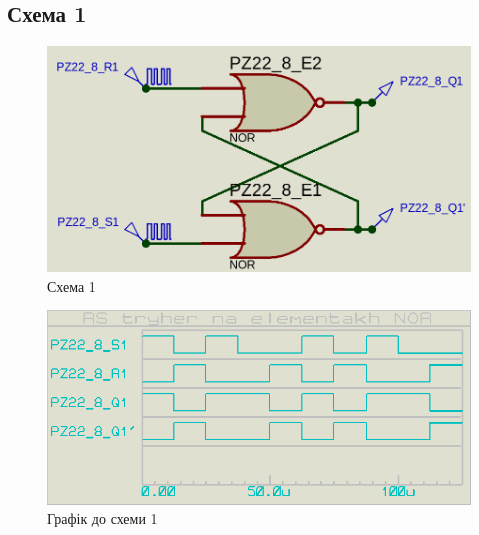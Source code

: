 \documentclass{article}
\begin{document}
\begin{normalsize}
	\section*{Схема 1}	
	\begin{figure}[H]
		\centering
		\includegraphics[scale=0.25]{s1}	
		\caption{Схема 1}
	\end{figure}

	\begin{figure}[H]
		\centering
		\includegraphics[scale=0.25]{g1}	
		\caption{Графік до схеми 1}
	\end{figure}
	

\end{normalsize}
\end{document}
